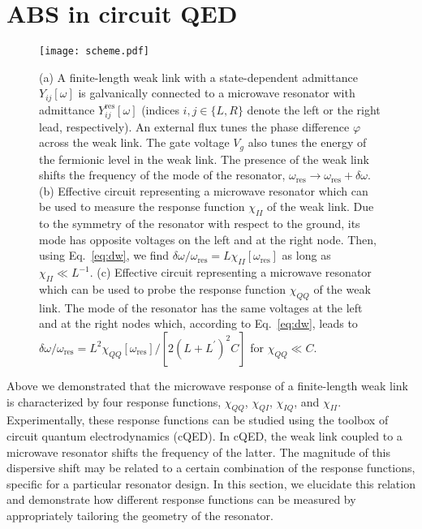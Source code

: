 \documentclass[aps,reprint,longbibliography, prb]{revtex4-2}
\begin{document}
\section{ABS in circuit QED}
\label{sec:cqed}
\begin{figure*}[t]
  \begin{center}
    \texttt{[image: scheme.pdf]}
    \caption{(a) A finite-length weak link with a state-dependent admittance $Y_{ij}[\omega]$ is galvanically connected to a microwave resonator with admittance $Y_{ij}^\mathrm{res}[\omega]$ (indices $i,j\in\{L,R\}$ denote the left or the right lead, respectively). An external flux tunes the phase difference $\varphi$ across the weak link. The gate voltage $V_g$ also tunes the energy of the fermionic level in the weak link. The presence of the weak link shifts the frequency of the mode of the resonator, $\omega_\mathrm{res} \rightarrow \omega_\mathrm{res} + \delta \omega$. (b) Effective circuit representing a microwave resonator which can be used to measure the response function $\chi_{II}$ of the weak link. Due to the symmetry of the resonator {with respect to the ground}, its mode has opposite voltages on the left and at the right node. Then, using Eq.~\eqref{eq:dw}, we find $\delta\omega/\omega_\mathrm{res} =  L\chi_{II}[\omega_\mathrm{res}]$ as long as $\chi_{II}\ll L^{-1}$. (c) Effective circuit representing a microwave resonator which can be used to probe the response function $\chi_{QQ}$ of the weak link. The mode of the resonator has the same voltages at the left and at the right nodes which, according to Eq.~\eqref{eq:dw}, leads to $\delta\omega/\omega_\mathrm{res} = L^2\chi_{QQ}[\omega_\mathrm{res}]/[2 (L+L^\prime)^2 C]$ for $\chi_{QQ}\ll C$.}
    \label{fig:resonators}
  \end{center}
\end{figure*}

Above we demonstrated that the microwave response of a finite-length weak link is characterized by four response functions, $\chi_{QQ}$, $\chi_{QI}$, $\chi_{IQ}$, and $\chi_{II}$. Experimentally, these response functions can be studied using the toolbox of circuit quantum electrodynamics (cQED). In cQED, the weak link coupled to a microwave resonator shifts the frequency of the latter. The magnitude of this dispersive shift may be related to a certain combination of the response functions, specific for a particular resonator design. In this section, we elucidate this relation and demonstrate how different response functions can be measured by appropriately tailoring the geometry of the resonator.
\end{document}
